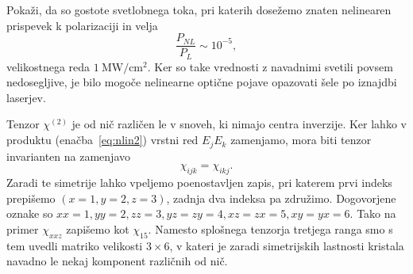 \begin{definition}
Pokaži, da so gostote svetlobnega toka, pri katerih dosežemo znaten nelinearen 
prispevek k polarizaciji in velja
 $$\frac{P_{NL}}{P_L} \sim 10^{-5},$$
velikostnega reda $1~\si{\mega\watt/\centi\metre^2}$. 
Ker so take vrednosti z navadnimi svetili povsem nedosegljive, je bilo mogoče nelinearne
optične pojave opazovati šele po iznajdbi laserjev.
\end{definition}
 
Tenzor $\chi^{(2)}$ je od nič različen le v snoveh, ki nimajo centra inverzije. 
Ker lahko v produktu (enačba~\ref{eq:nlin2}) vrstni red $E_j E_k$ zamenjamo, mora biti
tenzor invarianten na zamenjavo
\begin{equation}
\chi_{ijk} = \chi_{ikj}.
\label{eq:chijk}
\end{equation}
Zaradi te simetrije lahko vpeljemo poenostavljen zapis, pri katerem prvi indeks 
prepišemo $(x = 1, y = 2, z = 3)$,
zadnja dva indeksa pa združimo. Dogovorjene oznake so $xx = 1, yy = 2, zz = 3, yz = zy =4, 
xz = zx =5, xy = yx = 6$. Tako na primer $\chi_{xxz}$ zapišemo kot $\chi_{15}$. Namesto
splošnega tenzorja tretjega ranga smo s tem uvedli matriko velikosti $3\times6$,
v kateri je zaradi simetrijskih lastnosti kristala navadno le nekaj komponent 
različnih od nič. 

